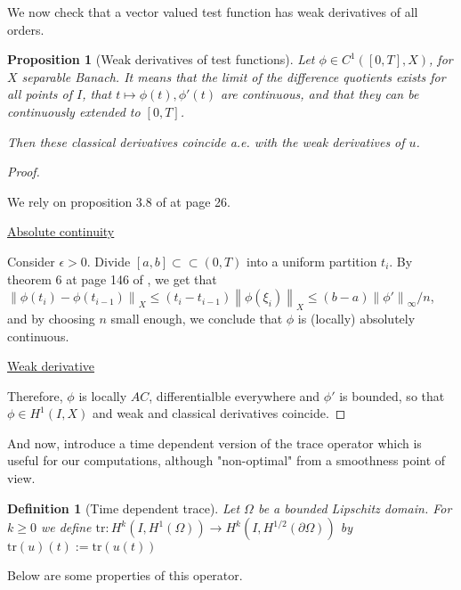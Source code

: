 \documentclass[english,a4paper,12pt,oneside]{scrbook}
\theoremstyle{break}
\newtheorem{defn}[equation]{Definition}
\newtheorem{prop}[equation]{Proposition}
\newenvironment{mproof}[1][\proofname]{%
  \begin{proof}[#1]$ $\par\nobreak\ignorespaces
}{%
  \end{proof}
}
\renewcommand*{\proofname}{Proof}
\theoremstyle{remark}
\newcommand{\ds}{\displaystyle}
\newcommand{\norm}[1]{\left\lVert#1\right\rVert}
\newcommand{\tr}{\text{tr}}
\newcommand{\cc}{\subset\subset}
\begin{document}
We now check that a vector valued test function has weak derivatives of all orders.

\begin{prop}[Weak derivatives of test functions]
\label{prop:weak_class}
Let $\phi \in C^1([0,T],X)$, for $X$ separable Banach. It means that the limit of the difference quotients exists for all points of $I$, that $t\mapsto \phi(t), \phi'(t)$ are continuous, and that they can be continuously extended to $[0,T]$.

Then these classical derivatives coincide a.e. with the weak derivatives of $u$.

\end{prop}
\begin{mproof}


We rely on proposition 3.8 of \cite{kreuter} at page 26.

\underline{Absolute continuity}

Consider $\epsilon >0$. Divide $[a,b] \cc (0,T)$ into a uniform partition $t_i$. By theorem 6 at page 146 of \cite{mvt}, we get that $\ds \norm{\phi(t_i)-\phi(t_{i-1})}_X \leq (t_i-t_{i-1})\norm{\phi(\xi_i)}_X\leq (b-a) \norm{\phi'}_{\infty}/n$, and by choosing $n$ small enough, we conclude that $\phi$ is (locally) absolutely continuous.

\underline{Weak derivative}

Therefore, $\phi$ is locally $AC$, differentialble everywhere and $\phi'$ is bounded, so that $\phi \in H^1(I,X)$ and weak and classical derivatives coincide. 

\end{mproof}

And now, introduce a time dependent version of the trace operator which is useful for our computations, although "non-optimal" from a smoothness point of view.

\begin{defn}[Time dependent trace]
Let $\Omega$ be a bounded Lipschitz domain. For $k\geq 0$ we define $\tr: H^k(I,H^1(\Omega))\rightarrow H^k(I, H^{1/2} (\partial \Omega))$ by $\tr(u)(t):=\tr(u(t))$
\end{defn}

Below are some properties of this operator.
\end{document}

